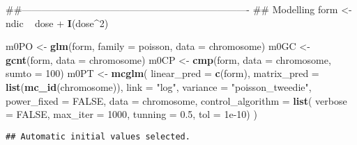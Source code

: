 \documentclass[9pt,a5paper,]{book}
\newenvironment{Shaded}{}{}
\newcommand{\KeywordTok}[1]{\textbf{{#1}}}
\newcommand{\DataTypeTok}[1]{\underline{{#1}}}
\newcommand{\DecValTok}[1]{{#1}}
\newcommand{\FloatTok}[1]{{#1}}
\newcommand{\StringTok}[1]{{#1}}
\newcommand{\OtherTok}[1]{{#1}}
\newcommand{\NormalTok}[1]{{#1}}
\renewenvironment{Shaded}{\color{inputcolor}}{}
\renewcommand{\DataTypeTok}[1]{{#1}}
\theoremstyle{definition}
\theoremstyle{definition}
\theoremstyle{remark}
\begin{document}
\begin{Shaded}
\begin{Highlighting}[]
\NormalTok{##----------------------------------------------------------------------}
\NormalTok{## Modelling}
\NormalTok{form <-}\StringTok{ }\NormalTok{ndic ~}\StringTok{ }\NormalTok{dose +}\StringTok{ }\KeywordTok{I}\NormalTok{(dose^}\DecValTok{2}\NormalTok{)}

\NormalTok{m0PO <-}\StringTok{ }\KeywordTok{glm}\NormalTok{(form, }\DataTypeTok{family =} \NormalTok{poisson, }\DataTypeTok{data =} \NormalTok{chromosome)}
\NormalTok{m0GC <-}\StringTok{ }\KeywordTok{gcnt}\NormalTok{(form, }\DataTypeTok{data =} \NormalTok{chromosome)}
\NormalTok{m0CP <-}\StringTok{ }\KeywordTok{cmp}\NormalTok{(form, }\DataTypeTok{data =} \NormalTok{chromosome, }\DataTypeTok{sumto =} \DecValTok{100}\NormalTok{)}
\NormalTok{m0PT <-}\StringTok{ }\KeywordTok{mcglm}\NormalTok{(}
    \DataTypeTok{linear_pred =} \KeywordTok{c}\NormalTok{(form),}
    \DataTypeTok{matrix_pred =} \KeywordTok{list}\NormalTok{(}\KeywordTok{mc_id}\NormalTok{(chromosome)),}
    \DataTypeTok{link =} \StringTok{"log"}\NormalTok{,}
    \DataTypeTok{variance =} \StringTok{"poisson_tweedie"}\NormalTok{,}
    \DataTypeTok{power_fixed =} \OtherTok{FALSE}\NormalTok{,}
    \DataTypeTok{data =} \NormalTok{chromosome,}
    \DataTypeTok{control_algorithm =} \KeywordTok{list}\NormalTok{(}
        \DataTypeTok{verbose =} \OtherTok{FALSE}\NormalTok{, }\DataTypeTok{max_iter =} \DecValTok{1000}\NormalTok{,}
        \DataTypeTok{tunning =} \FloatTok{0.5}\NormalTok{, }\DataTypeTok{tol =} \FloatTok{1e-10}\NormalTok{)}
\NormalTok{)}
\end{Highlighting}
\end{Shaded}

\begin{verbatim}
## Automatic initial values selected.
\end{verbatim}
\end{document}
